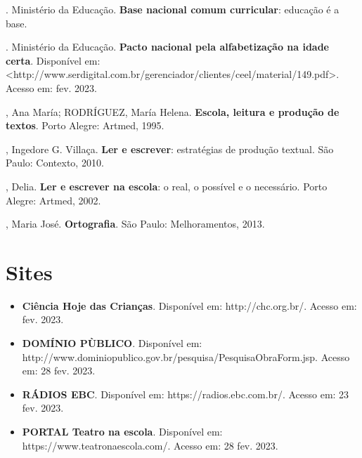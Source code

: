 \begin{bibliohedra}
. Ministério da Educação. \textbf{Base nacional comum curricular}:
educação é a base.

. Ministério da Educação. \textbf{Pacto nacional pela
alfabetização na idade certa}. Disponível em:
\textless{}http://www.serdigital.com.br/gerenciador/clientes/ceel/material/149.pdf\textgreater{}.
Acesso em: fev. 2023.

, Ana María; RODRÍGUEZ, María Helena. \textbf{Escola, leitura e
produção de textos}. Porto Alegre: Artmed, 1995.

, Ingedore G. Villaça. \textbf{Ler e escrever}: estratégias de
produção textual. São Paulo: Contexto, 2010.

, Delia. \textbf{Ler e escrever na escola}: o real, o possível e o
necessário. Porto Alegre: Artmed, 2002.

, Maria José. \textbf{Ortografia}. São Paulo: Melhoramentos,
2013.
\end{bibliohedra}

\chapter{Sites}

\begin{itemize}
\item\textbf{Ciência Hoje das Crianças}. Disponível em:
http://chc.org.br/. Acesso em: fev. 2023.

\item\textbf{DOMÍNIO PÙBLICO}. Disponível em:
http://www.dominiopublico.gov.br/pesquisa/PesquisaObraForm.jsp.
Acesso em: 28 fev. 2023.

\item\textbf{RÁDIOS EBC}. Disponível em: https://radios.ebc.com.br/. Acesso
em: 23 fev. 2023.

\item\textbf{PORTAL Teatro na escola}. Disponível em:
https://www.teatronaescola.com/. Acesso em: 28 fev. 2023.
\end{itemize}
